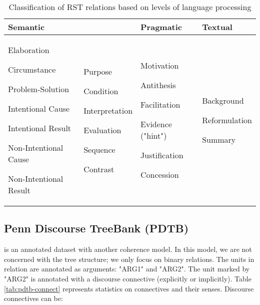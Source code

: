 \documentclass{KBook}
\begin{document}
\begin{table}[ht]
	\centering\small
	\begin{tabular}{p{}p{}p{}p{}}
		\hline\hline
		\textbf{Semantic} && \textbf{Pragmatic} & \textbf{Textual} \\
		\hline
		
		Elaboration
		
		Circumstance
		
		Problem-Solution
		
		Intentional Cause
		
		Intentional Result
		
		Non-Intentional Cause
		
		Non-Intentional Result
		&
		Purpose
		
		Condition
		
		Interpretation
		
		Evaluation
		
		Sequence
		
		Contrast
		
		&
		
		Motivation
		
		Antithesis
		
		Facilitation
		
		Evidence ("hint")
		
		Justification
		
		Concession
		
		&
		
		Background
		
		Reformulation
		
		Summary\\
		\hline\hline
	\end{tabular}
	\caption[Classification of RST relations based on levels of language processing]{Classification of RST relations based on levels of language processing \cite{2006-Cornish}}
	\label{tab:rst-niveau}
\end{table}


\subsection{Penn Discourse TreeBank (PDTB)}

 is an annotated dataset with another coherence model. In this model, we are not concerned with the tree structure; we only focus on binary relations. The units in relation are annotated as arguments: "ARG1" and "ARG2". The unit marked by "ARG2" is annotated with a discourse connective (explicitly or implicitly). Table \ref{tab:pdtb-connect} represents statistics on connectives and their senses. Discourse connectives can be:
\end{document}
